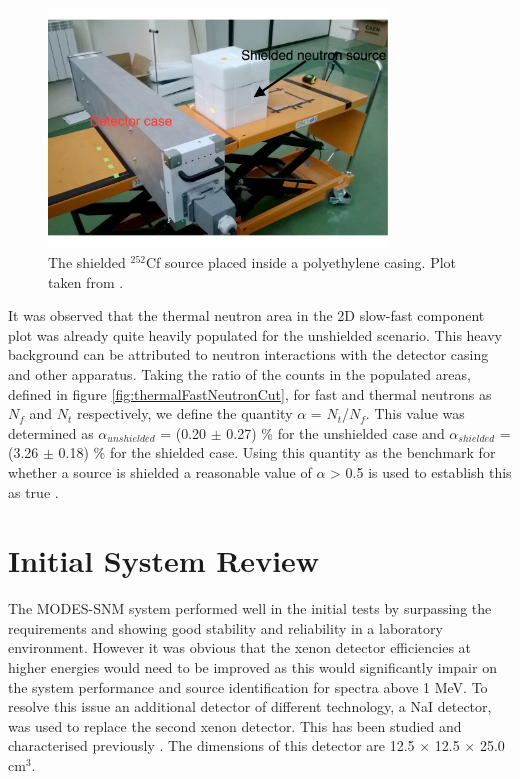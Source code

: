 \begin{figure}[htbp]
\begin{center}
\includegraphics[width=90mm]{Chapter8/figures/cf252ShieldedSource.pdf}
\caption{The shielded $^{252}$Cf source placed inside a polyethylene casing. Plot taken from \cite{modesInternal}.}
\label{fig:thermalNeutronCf252Shielded}
\end{center}
\end{figure}

It was observed that the thermal neutron area in the 2D slow-fast component plot was already quite heavily populated for the unshielded scenario. This heavy background can be attributed to neutron interactions with the detector casing and other apparatus. Taking the ratio of the counts in the populated areas, defined in figure \ref{fig:thermalFastNeutronCut}, for fast and thermal neutrons as $N_{f}$ and $N_{t}$ respectively, we define the quantity $\alpha$ = $N_{t}$/$N_{f}$. This value was determined as $\alpha_{unshielded}$ = (0.20 $\pm$ 0.27) \% for the unshielded case and $\alpha_{shielded}$ = (3.26 $\pm$ 0.18) \% for the shielded case. Using this quantity as the benchmark for whether a source is shielded a reasonable value of $\alpha$ > 0.5 is used to establish this as true \cite{modesInternal}.

\section{Initial System Review}
The MODES-SNM system performed well in the initial tests by surpassing the requirements and showing good stability and reliability in a laboratory environment. However it was obvious that the xenon detector efficiencies at higher energies would need to be improved as this would significantly impair on the system performance and source identification for spectra above 1 MeV. To resolve this issue an additional detector of different technology, a NaI detector, was used to replace the second xenon detector. This has been studied and characterised previously \cite{modesInternal}. The dimensions of this detector are 12.5 $\times$ 12.5 $\times$ 25.0 cm$^{3}$. 

